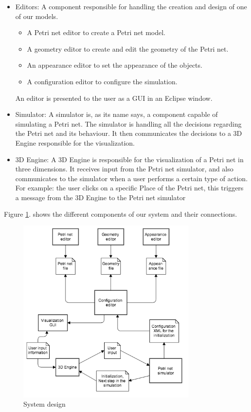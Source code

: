 \begin{itemize}
  \item Editors: A component responsible for handling the creation and design of one of our models. 
	\begin{itemize}
	 \item A Petri net editor to create a Petri net model.
	 \item A geometry editor to create and edit the geometry of the Petri net.
	 \item An appearance editor to set the appearance of the objects.
	 \item A configuration editor to configure the simulation.
	 \end{itemize}
	An editor is presented to the user as a GUI in an Eclipse window.
  \item Simulator: A simulator is, as its name says, a component capable of simulating a Petri net.
	The simulator is handling all the decisions regarding the Petri net and its behaviour. 
	It then communicates the decisions to a 3D Engine responsible for the visualization.
  \item 3D Engine: A 3D Engine is responsible for the visualization of a Petri net in three dimensions.
	It receives input from the Petri net simulator, and also communicates to the simulator when a user performs a certain type of action. \newline
	For example: the user clicks on a specific Place of the Petri net, this triggers a message from the 3D Engine to the Petri net simulator 
\end{itemize}

Figure \ref{fig:system_diagram}. shows the different components of our system and their connections.

\begin{figure}[htp]
\begin{center}
  \includegraphics[width=0.8\textwidth]{image/system_design.png}
  \caption{System design}
  \label{fig:system_diagram}
\end{center}
\end{figure}

